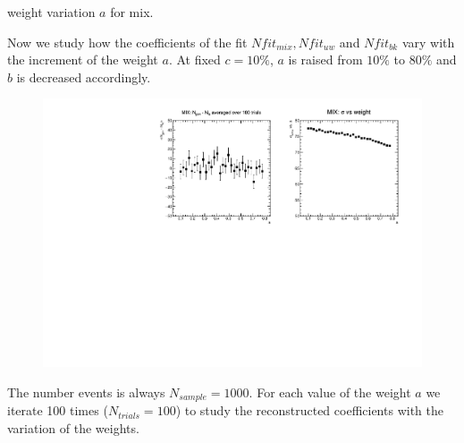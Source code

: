 \documentclass[9pt]{beamer}
\begin{document}
\begin{frame}{weight variation $a$ for mix.}

Now we study how the coefficients of the fit $Nfit_{mix}, Nfit_{uw}$ and $Nfit_{bk}$ vary with the increment of the weight $a$. 
At fixed $c = 10\%$, $a$ is raised from $10\%$ to $80\%$ and $b$ is decreased accordingly. 

\begin{figure}
\vspace{-7pt}
\includegraphics[width = 1\textwidth , valign = t]{N1000/Nmix_and_Sigma(80,10,10).pdf}
\end{figure}
The number events is always $ N_{sample} = 1000$. For each value of the weight $a$  we\\ iterate 100 times ($N_{trials} = 100$) to study the reconstructed coefficients with the \\ variation of the weights.
\end{frame}
\end{document}
